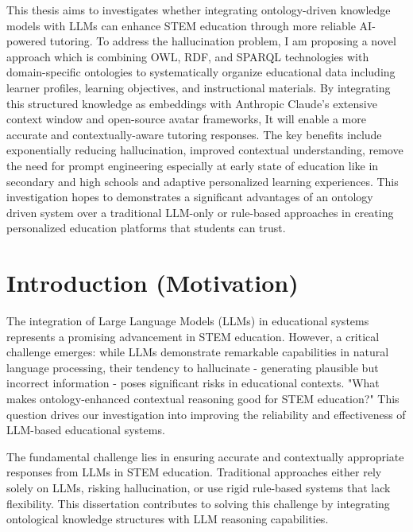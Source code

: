 \documentclass[a4paper,11pt,oneside]{article}
\begin{document}
  This thesis aims to investigates whether integrating ontology-driven knowledge models with LLMs can enhance STEM education through more 
  reliable AI-powered tutoring. To address the hallucination problem, I am proposing a novel approach which is combining OWL, RDF, and SPARQL technologies 
  with domain-specific ontologies to systematically organize educational data including learner profiles, learning objectives, and instructional materials. 
  By integrating this structured knowledge as embeddings with Anthropic Claude's extensive context window and open-source avatar frameworks, 
  It will enable a more accurate and contextually-aware tutoring responses. The key benefits include exponentially reducing hallucination, 
  improved contextual understanding, remove the need for prompt engineering especially at early state of education like in secondary and high schools 
  and adaptive personalized learning experiences. This investigation hopes to  demonstrates a significant 
  advantages of an ontology driven system over a traditional LLM-only or rule-based approaches in creating personalized education platforms that students can trust.

  \newpage
  \tableofcontents

  \clearpage

  \section{Introduction (Motivation)}

  The integration of Large Language Models (LLMs) in educational systems represents a promising advancement in STEM education. 
  However, a critical challenge emerges: while LLMs demonstrate remarkable capabilities in natural language processing, their 
  tendency to hallucinate - generating plausible but incorrect information - poses significant risks in educational contexts. 
  "What makes ontology-enhanced contextual reasoning good for STEM education?" This question drives our investigation into 
  improving the reliability and effectiveness of LLM-based educational systems.

  The fundamental challenge lies in ensuring accurate and contextually appropriate responses from LLMs in STEM education. 
  Traditional approaches either rely solely on LLMs, risking hallucination, or use rigid rule-based systems that lack 
  flexibility. This dissertation contributes to solving this challenge by integrating ontological knowledge structures 
  with LLM reasoning capabilities.
\end{document}
